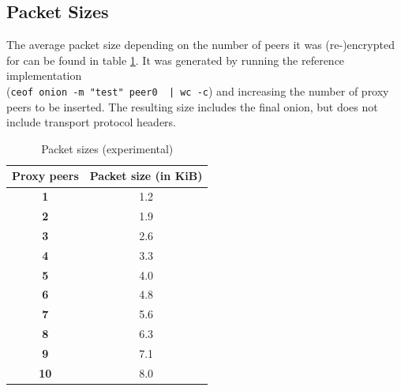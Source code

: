 \subsection{Packet Sizes}
The average packet size depending on the number of peers it was
(re-)encrypted for can be found in table \ref{pkgsizes}.
It was generated by running the reference implementation\\
(\verb=ceof onion -m "test" peer0  | wc -c=)
and increasing the number of proxy peers to be inserted.
The resulting size includes the final onion, 
but does not include transport protocol headers.
\begin{longtable}{|c|c|}
\caption{Packet sizes (experimental)}
\label{pkgsizes}\\
\hline
\textbf{Proxy peers} & \textbf{Packet size (in KiB)}\\
\hline
\textbf{1} & 1.2\\
\hline
\textbf{2} & 1.9\\
\hline
\textbf{3} & 2.6\\
\hline
\textbf{4} & 3.3\\
\hline
\textbf{5} & 4.0\\
\hline
\textbf{6} & 4.8\\
\hline
\textbf{7} & 5.6\\
\hline
\textbf{8} & 6.3\\
\hline
\textbf{9} & 7.1\\
\hline
\textbf{10} & 8.0\\
\hline
\end{longtable}
